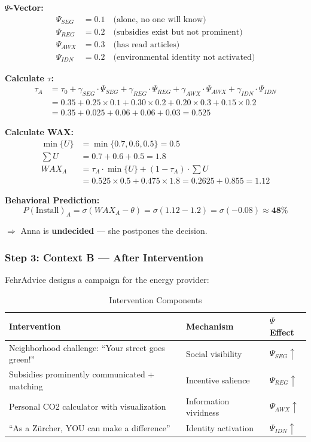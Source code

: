 \textbf{$\Psi$-Vector:}
\begin{align*}
\Psi_{SEG} &= 0.1 \quad \text{(alone, no one will know)} \\
\Psi_{REG} &= 0.2 \quad \text{(subsidies exist but not prominent)} \\
\Psi_{AWX} &= 0.3 \quad \text{(has read articles)} \\
\Psi_{IDN} &= 0.2 \quad \text{(environmental identity not activated)}
\end{align*}

\textbf{Calculate $\tau$:}
\begin{align}
\tau_A &= \tau_0 + \gamma_{SEG} \cdot \Psi_{SEG} + \gamma_{REG} \cdot \Psi_{REG} + \gamma_{AWX} \cdot \Psi_{AWX} + \gamma_{IDN} \cdot \Psi_{IDN} \nonumber \\
&= 0.35 + 0.25 \times 0.1 + 0.30 \times 0.2 + 0.20 \times 0.3 + 0.15 \times 0.2 \nonumber \\
&= 0.35 + 0.025 + 0.06 + 0.06 + 0.03 = \mathbf{0.525}
\end{align}

\textbf{Calculate WAX:}
\begin{align}
\min\{U\} &= \min\{0.7, 0.6, 0.5\} = 0.5 \\
\sum U &= 0.7 + 0.6 + 0.5 = 1.8 \\
WAX_A &= \tau_A \cdot \min\{U\} + (1-\tau_A) \cdot \sum U \nonumber \\
&= 0.525 \times 0.5 + 0.475 \times 1.8 = 0.2625 + 0.855 = \mathbf{1.12}
\end{align}

\textbf{Behavioral Prediction:}
\begin{equation}
P(\text{Install})_A = \sigma(WAX_A - \theta) = \sigma(1.12 - 1.2) = \sigma(-0.08) \approx \mathbf{48\%}
\end{equation}

$\Rightarrow$ Anna is \textbf{undecided} --- she postpones the decision.

\subsubsection{Step 3: Context B --- After Intervention}

FehrAdvice designs a campaign for the energy provider:

\begin{table}[htbp]
\centering
\caption{Intervention Components}
\begin{tabular}{@{}lll@{}}
\toprule
\textbf{Intervention} & \textbf{Mechanism} & \textbf{$\Psi$ Effect} \\
\midrule
Neighborhood challenge: ``Your street goes green!'' & Social visibility & $\Psi_{SEG} \uparrow$ \\
Subsidies prominently communicated + matching & Incentive salience & $\Psi_{REG} \uparrow$ \\
Personal CO2 calculator with visualization & Information vividness & $\Psi_{AWX} \uparrow$ \\
``As a Zürcher, YOU can make a difference'' & Identity activation & $\Psi_{IDN} \uparrow$ \\
\bottomrule
\end{tabular}
\end{table}

